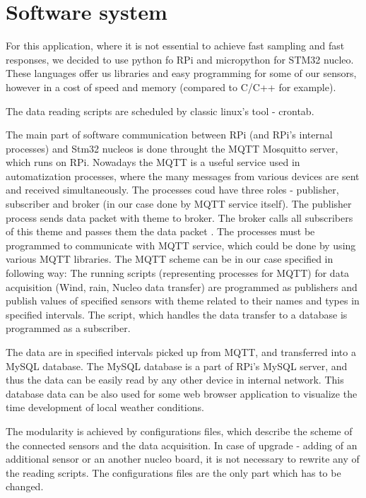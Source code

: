 
\section{Software system}
For this application, where it is not essential to achieve fast sampling and fast responses, we decided to use python fo RPi and micropython for STM32 nucleo. These languages offer us libraries and easy programming for some of our sensors, however in a cost of speed and memory (compared to C/C++ for example).
\par
The data reading scripts are scheduled by classic linux's tool - crontab.


\par
The main part of software communication between RPi (and RPi's internal processes) and Stm32 nucleos is done throught the MQTT Mosquitto server, which runs on RPi. Nowadays the MQTT is a useful service used in automatization processes, where the many messages from various devices are sent and received simultaneously. The processes coud have three roles - publisher, subscriber and broker (in our case done by MQTT service itself). The publisher process sends data packet with theme to broker. The broker calls all subscribers of this theme and passes them the data packet \cite{MqttServ}. The processes must be programmed to communicate with MQTT service, which could be done by using various MQTT libraries. The MQTT scheme can be in our case specified in following way: The running scripts (representing processes for MQTT) for data acquisition (Wind, rain, Nucleo data transfer) are programmed as publishers and publish values of specified sensors with theme related to their names and types in specified intervals. The script, which handles the data transfer to a database is programmed as a subscriber.


\par
The data are in specified intervals picked up from MQTT, and transferred into a MySQL database. The MySQL database is a part of RPi's MySQL server, and thus the data can be easily read by any other device in internal network. This database data can be also used for some web browser application to visualize the time development of local weather conditions.

\par
The modularity is achieved by configurations files, which describe the scheme of the connected sensors and the data acquisition. In case of upgrade - adding of an additional sensor or an another nucleo board, it is not necessary to rewrite any of the reading scripts. The configurations files are the only part which has to be changed.

